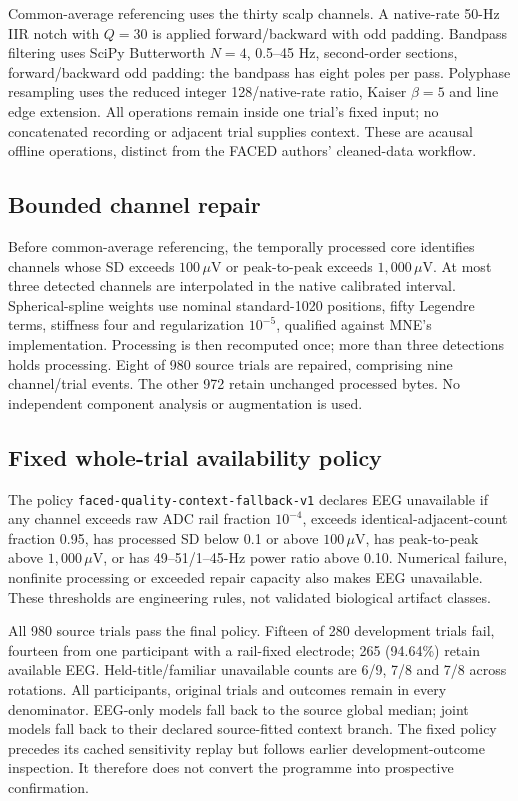 \documentclass[11pt,a4paper]{article}
\begin{document}
Common-average referencing uses the thirty scalp channels. A native-rate 50-Hz IIR notch with \(Q=30\) is applied forward/backward with odd padding. Bandpass filtering uses SciPy Butterworth \(N=4\), 0.5--45 Hz, second-order sections, forward/backward odd padding: the bandpass has eight poles per pass. Polyphase resampling uses the reduced integer 128/native-rate ratio, Kaiser \(\beta=5\) and line edge extension. All operations remain inside one trial's fixed input; no concatenated recording or adjacent trial supplies context. These are acausal offline operations, distinct from the FACED authors' cleaned-data workflow.

\subsection{Bounded channel repair}
Before common-average referencing, the temporally processed core identifies channels whose SD exceeds \(100\,\mu\mathrm{V}\) or peak-to-peak exceeds \(1{,}000\,\mu\mathrm{V}\). At most three detected channels are interpolated in the native calibrated interval. Spherical-spline weights \cite{perrin1989spherical} use nominal standard-1020 positions, fifty Legendre terms, stiffness four and regularization \(10^{-5}\), qualified against MNE's implementation. Processing is then recomputed once; more than three detections holds processing. Eight of 980 source trials are repaired, comprising nine channel/trial events. The other 972 retain unchanged processed bytes. No independent component analysis or augmentation is used.

\subsection{Fixed whole-trial availability policy}
The policy \texttt{faced-quality-context-fallback-v1} declares EEG unavailable if any channel exceeds raw ADC rail fraction \(10^{-4}\), exceeds identical-adjacent-count fraction 0.95, has processed SD below 0.1 or above \(100\,\mu\mathrm{V}\), has peak-to-peak above \(1{,}000\,\mu\mathrm{V}\), or has 49--51/1--45-Hz power ratio above 0.10. Numerical failure, nonfinite processing or exceeded repair capacity also makes EEG unavailable. These thresholds are engineering rules, not validated biological artifact classes.

All 980 source trials pass the final policy. Fifteen of 280 development trials fail, fourteen from one participant with a rail-fixed electrode; 265 (94.64\%) retain available EEG. Held-title/familiar unavailable counts are 6/9, 7/8 and 7/8 across rotations. All participants, original trials and outcomes remain in every denominator. EEG-only models fall back to the source global median; joint models fall back to their declared source-fitted context branch. The fixed policy precedes its cached sensitivity replay but follows earlier development-outcome inspection. It therefore does not convert the programme into prospective confirmation.
\end{document}
